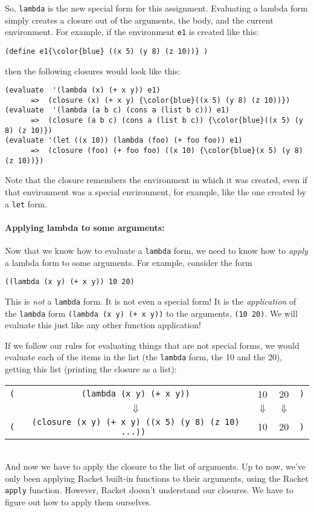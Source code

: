 \documentclass{article}
\begin{document}
So, {\tt lambda} is the new special form for this assignment.
Evaluating a lambda form simply creates a closure out of the
arguments, the body, and the current environment.
For example, if the environment {\tt e1}
is created like this:
\begin{Verbatim}[commandchars=\\\{\}]
(define e1{\color{blue} ((x 5) (y 8) (z 10))} )
\end{Verbatim}
then the following closures would look like this:
\begin{Verbatim}[frame=single,commandchars=\\\{\}]
(evaluate  '(lambda (x) (+ x y)) e1)
      =>  (closure (x) (+ x y) {\color{blue}((x 5) (y 8) (z 10))})
(evaluate  '(lambda (a b c) (cons a (list b c))) e1)
      =>  (closure (a b c) (cons a (list b c)) {\color{blue}((x 5) (y 8) (z 10)})
(evaluate '(let ((x 10)) (lambda (foo) (+ foo foo)) e1)
      =>  (closure (foo) (+ foo foo) ((x 10) {\color{blue}(x 5) (y 8) (z 10))})
\end{Verbatim}
Note that the closure remembers the environment in which it was
created, even if that environment was a special environment, for
example, like the one created by a {\tt let} form.

\paragraph{Applying lambda to some arguments:}

Now that we know how to evaluate a {\tt lambda} form, we need to know
how to {\em apply} a lambda form to some arguments.  For example,
consider the form
\begin{Verbatim}[frame=single]
  ((lambda (x y) (+ x y)) 10 20)
\end{Verbatim}
This is {\em not} a {\tt lambda} form.  It is not even a special form!
It is the {\em application} of
the {\tt lambda} form {\tt (lambda (x y) (+ x y))} to the arguments,
{\tt (10 20)}.  We will evaluate this just like any other
function application!

If we follow our rules for evaluating things that are
not special forms, we would evaluate each of the items in the list
(the {\tt lambda} form, the 10 and the 20), getting this list
(printing the closure as a list):\\
\begin{tabular}{|rcccl|}\hline
  {\tt (}&{\tt (lambda (x y) (+ x y))} & 10 & 20 & {\tt )}\\
         &  \ensuremath{\Downarrow} & \ensuremath{\Downarrow} & \ensuremath{\Downarrow} &\\
  {\tt (} & {\tt (closure (x y) (+ x y) {\color{blue}((x 5) (y 8) (z
      10) ...)}) } & 10 &  20& {\tt )}\\\hline
\end{tabular}\\
And now we have to apply the closure to the list of arguments.  Up to
now, we've only been applying Racket built-in functions to their
arguments, using the Racket {\tt apply} function.  However, Racket
doesn't understand our closures.  We have to figure out how to apply
them ourselves.
\end{document}
